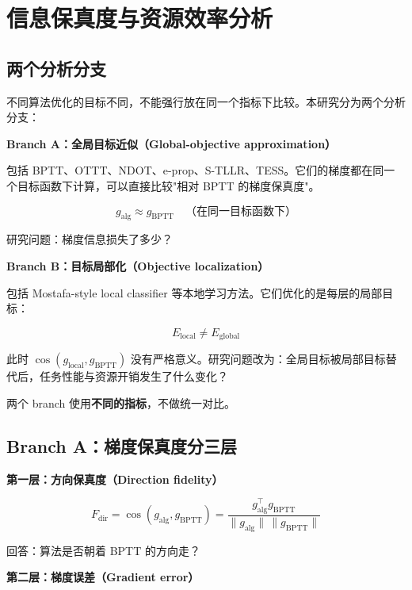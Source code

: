 \documentclass[journal,12pt,onecolumn]{IEEEtran}
\begin{document}
\section{信息保真度与资源效率分析}

\subsection{两个分析分支}

不同算法优化的目标不同，不能强行放在同一个指标下比较。本研究分为两个分析分支：

\textbf{Branch A：全局目标近似（Global-objective approximation）}

包括 BPTT、OTTT、NDOT、e-prop、S-TLLR、TESS。它们的梯度都在同一个目标函数下计算，可以直接比较"相对 BPTT 的梯度保真度"。

\begin{equation}
g_{\mathrm{alg}}\approx g_{\mathrm{BPTT}}\quad\text{（在同一目标函数下）}
\end{equation}

研究问题：梯度信息损失了多少？

\textbf{Branch B：目标局部化（Objective localization）}

包括 Mostafa-style local classifier 等本地学习方法。它们优化的是每层的局部目标：

\begin{equation}
E_{\mathrm{local}}\neq E_{\mathrm{global}}
\end{equation}

此时 $\cos(g_{\mathrm{local}},g_{\mathrm{BPTT}})$ 没有严格意义。研究问题改为：全局目标被局部目标替代后，任务性能与资源开销发生了什么变化？

两个 branch 使用\textbf{不同的指标}，不做统一对比。

\subsection{Branch A：梯度保真度分三层}

\textbf{第一层：方向保真度（Direction fidelity）}

\begin{equation}
F_{\mathrm{dir}}=\cos(g_{\mathrm{alg}},g_{\mathrm{BPTT}})=\frac{g_{\mathrm{alg}}^\top g_{\mathrm{BPTT}}}{\|g_{\mathrm{alg}}\|\,\|g_{\mathrm{BPTT}}\|}
\end{equation}

回答：算法是否朝着 BPTT 的方向走？

\textbf{第二层：梯度误差（Gradient error）}
\end{document}
